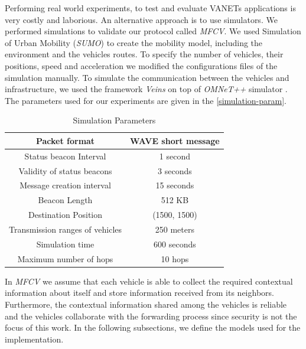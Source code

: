 \documentclass[letterpaper, 10 pt, conference]{ieeeconf}  %
\begin{document}
Performing real world experiments, to test and evaluate VANETs applications is very costly and laborious. An alternative approach is to use simulators. We performed simulations to validate our protocol called \emph{MFCV}. We used Simulation of Urban Mobility (\emph{SUMO}) \cite{SUMO-2012} to create the mobility model, including the environment and the vehicles routes. To specify the number of vehicles, their positions, speed and acceleration we modified the configurations files of the simulation manually. To simulate the communication between the vehicles and infrastructure, we used the framework \emph{Veins} \cite{veins2016} on top of \emph{OMNeT++} simulator \cite{omnet2016}. The parameters used for our experiments are given in the \autoref{simulation-param}.

\begin{table}[ht]
    \center
    \caption{Simulation Parameters} \label{simulation-param}
    \begin{tabular}{|c|c|}
        \hline
        Packet format                  & WAVE short message \\ \hline
        Status beacon Interval         & 1 second           \\ \hline
        Validity of status beacons     & 3 seconds          \\ \hline
        Message creation interval      & 15 seconds         \\ \hline
        Beacon Length                  & 512 KB             \\ \hline
        Destination Position           & (1500, 1500)       \\ \hline
        Transmission ranges of vehicles & 250 meters         \\ \hline
        Simulation time                & 600 seconds        \\ \hline
        Maximum number of hops         & 10 hops            \\ \hline
    \end{tabular}
\end{table}

In \emph{MFCV} we assume that each vehicle is able to collect the required contextual information about itself and store information received from its neighbors. Furthermore, the contextual information shared among the vehicles is reliable and the vehicles collaborate with the forwarding process since security is not the focus of this work. In the following subsections, we define the models used for the implementation.
\end{document}
